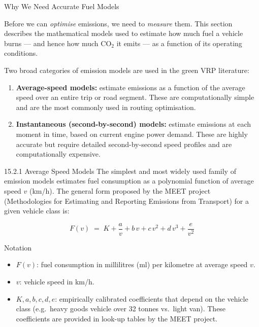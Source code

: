 \documentclass[aspectratio=169,10pt]{beamer}
\begin{document}
\begin{frame}[allowframebreaks]{Why We Need Accurate Fuel Models}

  Before we can \emph{optimise} emissions, we need to \emph{measure} them.
  This section describes the mathematical models used to estimate how much fuel
  a vehicle burns --- and hence how much CO$_2$ it emits --- as a function of
  its operating conditions.

  Two broad categories of emission models are used in the green VRP literature:

  \begin{enumerate}
    \item \textbf{Average-speed models:} estimate emissions as a function of
    the average speed over an entire trip or road segment.  These are
    computationally simple and are the most commonly used in routing
    optimisation.

    \item \textbf{Instantaneous (second-by-second) models:} estimate emissions
    at each moment in time, based on current engine power demand.  These are
    highly accurate but require detailed second-by-second speed profiles and are
    computationally expensive.
  \end{enumerate}

  \framebreak

  \begin{block}{15.2.1 Average Speed Models}
    The simplest and most widely used family of emission models estimates
    fuel consumption as a polynomial function of average speed $v$ (km/h).
    The general form proposed by the MEET project (Methodologies for Estimating
    and Reporting Emissions from Transport) for a given vehicle class is:

    \[
      F(v) \;=\; K + \frac{a}{v} + b\,v + c\,v^2 + d\,v^3 + \frac{e}{v^2}
    \]
  \end{block}

  \begin{block}{Notation}
    \begin{itemize}
      \item $F(v)$: fuel consumption in millilitres (ml) per kilometre at
      average speed $v$.
      \item $v$: vehicle speed in km/h.
      \item $K, a, b, c, d, e$: empirically calibrated coefficients that depend
      on the vehicle class (e.g.\ heavy goods vehicle over 32 tonnes vs.\ light
      van).  These coefficients are provided in look-up tables by the MEET
      project.
    \end{itemize}
  \end{block}


\end{frame}
\end{document}
